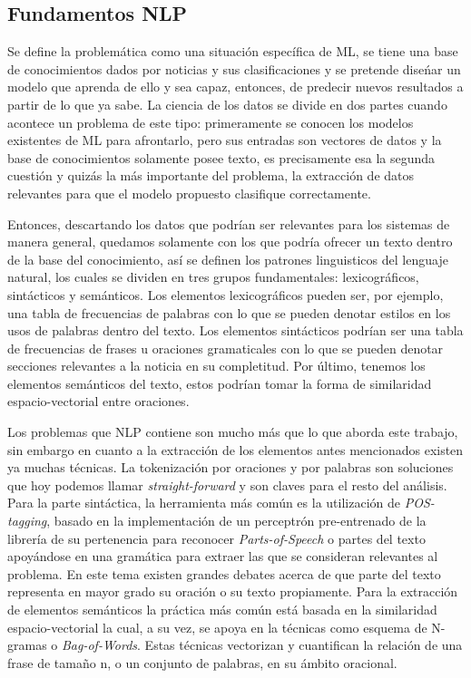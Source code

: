 \documentclass{llncs}
\begin{document}
\begin{multicols}{2}[]
\subsection{Fundamentos NLP}

Se define la problem\'atica como una situaci\'on espec\'ifica de ML, se tiene una base de conocimientos dados por noticias y sus clasificaciones y se pretende dise\'nar un modelo
que aprenda de ello y sea capaz, entonces, de predecir nuevos resultados a partir de lo que ya sabe. La ciencia de los datos se divide en dos partes cuando acontece un problema
de este tipo: primeramente se conocen los modelos existentes de ML para afrontarlo, pero sus entradas son vectores de datos y la base de conocimientos solamente posee texto, 
es precisamente esa la segunda cuesti\'on y quiz\'as la m\'as importante del problema, la extracci\'on de datos relevantes para que el modelo propuesto clasifique correctamente.

Entonces, descartando los datos que podr\'ian ser relevantes para los sistemas de manera general, quedamos solamente con los que podr\'ia ofrecer un texto dentro de la base del
conocimiento, as\'i se definen los patrones linguisticos del lenguaje natural, los cuales se dividen en tres grupos fundamentales: lexicogr\'aficos, sint\'acticos y sem\'anticos. Los 
elementos lexicogr\'aficos pueden ser, por ejemplo, una tabla de frecuencias de palabras con lo que se pueden denotar estilos en los usos de palabras dentro del texto. Los elementos
sint\'acticos podr\'ian ser una tabla de frecuencias de frases u oraciones gramaticales con lo que se pueden denotar secciones relevantes a la noticia en su completitud. Por \'ultimo,
tenemos los elementos sem\'anticos del texto, estos podr\'ian tomar la forma de similaridad espacio-vectorial entre oraciones.

Los problemas que NLP contiene son mucho m\'as que lo que aborda este trabajo, sin embargo en cuanto a la extracci\'on de los elementos antes mencionados existen ya muchas t\'ecnicas.
La tokenizaci\'on por oraciones y por palabras son soluciones que hoy podemos llamar \textit{straight-forward} y son claves para el resto del an\'alisis. Para la parte sint\'actica, la
herramienta m\'as com\'un es la utilizaci\'on de \textit{POS-tagging}, basado en la implementaci\'on de un perceptr\'on pre-entrenado de la librer\'ia de su pertenencia para reconocer
\textit{Parts-of-Speech} o partes del texto apoy\'andose en una gram\'atica para extraer las que se consideran relevantes al problema. En este tema existen grandes debates acerca
de que parte del texto representa en mayor grado su oraci\'on o su texto propiamente. Para la extracci\'on de elementos sem\'anticos la pr\'actica m\'as com\'un est\'a basada en la 
similaridad espacio-vectorial la cual, a su vez, se apoya en la t\'ecnicas como esquema de N-gramas o \textit{Bag-of-Words}. Estas t\'ecnicas vectorizan y cuantifican la relaci\'on de una 
frase de tama\~no n, o un conjunto de palabras, en su \'ambito oracional.


\end{multicols}
\end{document}
